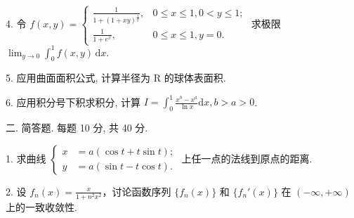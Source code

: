 \documentclass{examcollection}
\begin{document}
{\begin{minipage}{\textwidth}
4. 令 $f(x, y) = \begin{cases} \frac{1}{1 + (1 + xy)^{\frac{1}{y}}}, & 0 \leq x \leq 1, 0 < y \leq 1; \\ \frac{1}{1 + e^x}, & 0 \leq x \leq 1, y = 0. \end{cases}$ 求极限 $\lim_{y \to 0} \int_0^1 f(x, y) \, \mathrm{d}x$.\par
5. 应用曲面面积公式, 计算半径为 R 的球体表面积.\par
6. 应用积分号下积求积分, 计算 $I = \int_{0}^{1} \frac{x^{b} - x^{a}}{\ln x} \mathrm{d}x, b > a > 0$.\par
二. 简答题. 每题 10 分, 共 40 分.\par
1. 求曲线  $\left\{\begin{aligned}x &= a(\cos t + t \sin t); \\ y &= a(\sin t - t \cos t).\end{aligned}\right.$  上任一点的法线到原点的距离.\par
2. 设 $f_{n}(x) = \frac{x}{1 + n^{2}x^{2}}$，讨论函数序列 $\{f_{n}(x)\}$ 和 $\{f_{n}'(x)\}$ 在 $(- \infty, +\infty)$ 上的一致收敛性.\par
\end{minipage}}
\ifdim\dimexpr\ht\proofbox+\dp\proofbox\relax>\textheight
\noindent\resizebox{!}{\textheight}{\usebox{\proofbox}}\else\noindent\usebox{\proofbox}\fi\clearpage
\end{document}
